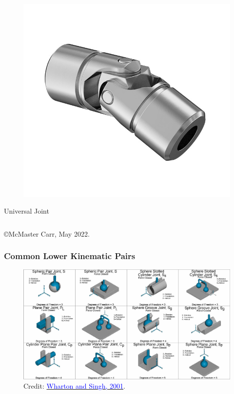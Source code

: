 \begin{frame}
\begin{columns}[t]
\begin{column}{.5\textwidth}
\begin{figure}
			\includegraphics[width=\textwidth]{figures/ujoint.jpg}
			\end{figure}
			\centering Universal Joint
		\end{column}
	\end{columns}
	\footnotesize{\copyright McMaster Carr, May 2022.}
\end{frame}





\begin{frame}
	\frametitle{Common Lower Kinematic Pairs}
	\begin{figure}[t]
		\centering
		\includegraphics[width=\columnwidth]{figures/pairs2.jpg}
		Credit: \href{https://www.semanticscholar.org/paper/Development-of-Solid-Models-and-Multimedia-of-Pairs-Wharton-Singh/7ba9c2f3cfed5a493bb5828976689764d024b087}{\textcolor{blue}{Wharton and Singh,  2001}}.
	\end{figure}
\end{frame}


